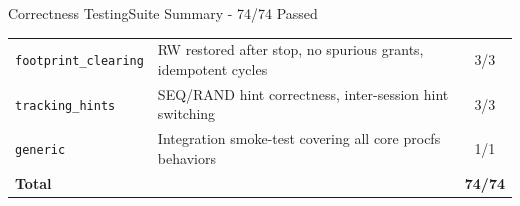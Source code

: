 \begin{frame}{Correctness Testing}{Suite Summary - 74/74 Passed}
\begin{center}
\begin{tabular}{lp{8.5cm}c}
\texttt{footprint\_clearing}     & RW restored after stop, no spurious grants, idempotent cycles      & 3/3 \\
\texttt{tracking\_hints}         & SEQ/RAND hint correctness, inter-session hint switching            & 3/3 \\
\texttt{generic}                 & Integration smoke-test covering all core procfs behaviors          & 1/1 \\
\midrule
\textbf{Total}                   &                                                                    & \textbf{74/74} \\
\bottomrule
\end{tabular}
\end{center}
\end{frame}



